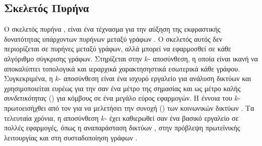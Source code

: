 \subsection{Σκελετός Πυρήνα }
\label{ssec:core}
Ο σκελετός πυρήνα , είναι ένα τέχνασμα για την αύξηση της εκφραστικής δυνατότητας υπάρχοντων πυρήνων μεταξύ γράφων \cite{nikolentzos2018}.
Ο σκελετός αυτός δεν περιορίζεται σε πυρήνες μεταξύ γράφων, αλλά μπορεί να εφαρμοσθεί σε κάθε αλγόριθμο σύγκρισης γράφων.
Στηρίζεται στην $k$- αποσύνθεση, η οποία είναι ικανή να αποκαλύπτει τοπολογικά και ιεραρχικά χαρακτησηστικά εσωτερικά κάθε γράφου.
Συγκεκριμένα, η $k$- αποσύνθεση είναι ένα ισχυρό εργαλείο για ανάλυση δικτύων και χρησιμοποιείται ευρέως για την σαν ένα μέτρο της σημασίας και ως μέτρο καλής \textit{συνδετικότητας} () για κόμβους σε ένα μεγάλο εύρος εφαρμογών.
Η έννοια του $k$- πρωτοεισήχθει από τον  για να μελετήσει την συνοχή () των κοινωνικών δικτύων \cite{seidman1983network}.
Τα τελευταία χρόνια, η αποσύνθεση $k$- έχει καθιερωθεί σαν ένα βασικό εργαλείο σε πολλές εφαρμογές, όπως η αναπαράσταση δικτύων \cite{alvarez2006large}, στην πρόβλεψη πρωτεϊνικής λειτουργίας \cite{wuchty2005peeling} και στη συσταδοποίηση γράφων \cite{giatsidis2014corecluster}.

